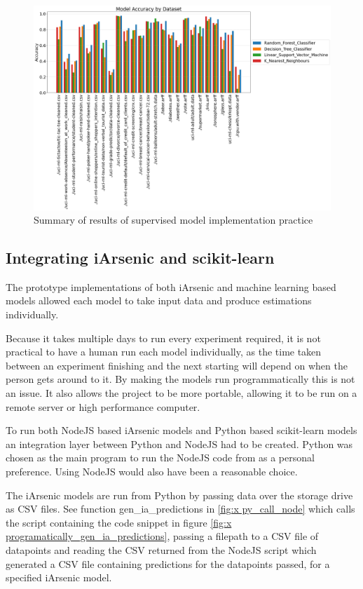 \begin{landscape}
    \begin{figure}[h]
        \centering
        \includegraphics[scale=0.375]{figures/4_models_25_datasets.png} 
        \caption{Summary of results of supervised model implementation practice}
        \label{fig:x 4_m_25_d}
    \end{figure}
\end{landscape}

\subsection{Integrating iArsenic and scikit-learn}

The prototype implementations of both iArsenic and machine learning based models allowed each model to take input data and produce estimations individually. 

Because it takes multiple days to run every experiment required, it is not practical to have a human run each model individually, as the time taken between an experiment finishing and the next starting will depend on when the person gets around to it. By making the models run programmatically this is not an issue. It also allows the project to be more portable, allowing it to be run on a remote server or high performance computer.

To run both NodeJS based iArsenic models and Python based scikit-learn models an integration layer between Python and NodeJS had to be created. Python was chosen as the main program to run the NodeJS code from as a personal preference. Using NodeJS would also have been a reasonable choice.

The iArsenic models are run from Python by passing data over the storage drive as CSV files. See function gen\_ia\_predictions in \ref{fig:x py_call_node} which calls the script containing the code snippet in figure \ref{fig:x programatically_gen_ia_predictions}, passing a filepath to a CSV file of datapoints and reading the CSV returned from the NodeJS script which generated a CSV file containing predictions for the datapoints passed, for a specified iArsenic model.


